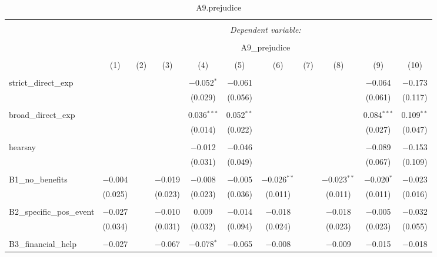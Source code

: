 
\begin{table}[H] \centering 
  \caption{A9.prejudice} 
  \label{} 
\tiny 
\begin{tabular}{@{\extracolsep{4pt}}lcccccccccc} 
\\[-1.8ex]\hline 
\hline \\[-1.8ex] 
 & \multicolumn{10}{c}{\textit{Dependent variable:}} \\ 
\cline{2-11} 
\\[-1.8ex] & \multicolumn{10}{c}{A9\_prejudice} \\ 
\\[-1.8ex] & (1) & (2) & (3) & (4) & (5) & (6) & (7) & (8) & (9) & (10)\\ 
\hline \\[-1.8ex] 
 strict\_direct\_exp &  &  &  & $-$0.052$^{*}$ & $-$0.061 &  &  &  & $-$0.064 & $-$0.173 \\ 
  &  &  &  & (0.029) & (0.056) &  &  &  & (0.061) & (0.117) \\ 
  & & & & & & & & & & \\ 
 broad\_direct\_exp &  &  &  & 0.036$^{***}$ & 0.052$^{**}$ &  &  &  & 0.084$^{***}$ & 0.109$^{**}$ \\ 
  &  &  &  & (0.014) & (0.022) &  &  &  & (0.027) & (0.047) \\ 
  & & & & & & & & & & \\ 
 hearsay &  &  &  & $-$0.012 & $-$0.046 &  &  &  & $-$0.089 & $-$0.153 \\ 
  &  &  &  & (0.031) & (0.049) &  &  &  & (0.067) & (0.109) \\ 
  & & & & & & & & & & \\ 
 B1\_no\_benefits & $-$0.004 &  & $-$0.019 & $-$0.008 & $-$0.005 & $-$0.026$^{**}$ &  & $-$0.023$^{**}$ & $-$0.020$^{*}$ & $-$0.023 \\ 
  & (0.025) &  & (0.023) & (0.023) & (0.036) & (0.011) &  & (0.011) & (0.011) & (0.016) \\ 
  & & & & & & & & & & \\ 
 B2\_specific\_pos\_event & $-$0.027 &  & $-$0.010 & 0.009 & $-$0.014 & $-$0.018 &  & $-$0.018 & $-$0.005 & $-$0.032 \\ 
  & (0.034) &  & (0.031) & (0.032) & (0.094) & (0.024) &  & (0.023) & (0.023) & (0.055) \\ 
  & & & & & & & & & & \\ 
 B3\_financial\_help & $-$0.027 &  & $-$0.067 & $-$0.078$^{*}$ & $-$0.065 & $-$0.008 &  & $-$0.009 & $-$0.015 & $-$0.018 \\ 

\end{tabular}
\end{table}
